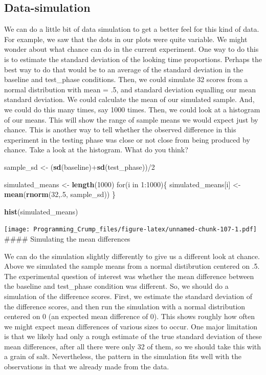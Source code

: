 \documentclass[]{book}
\newenvironment{Shaded}{\begin{snugshade}}{\end{snugshade}}
\newcommand{\KeywordTok}[1]{\textcolor[rgb]{0.13,0.29,0.53}{\textbf{{#1}}}}
\newcommand{\DecValTok}[1]{\textcolor[rgb]{0.00,0.00,0.81}{{#1}}}
\newcommand{\StringTok}[1]{\textcolor[rgb]{0.31,0.60,0.02}{{#1}}}
\newcommand{\NormalTok}[1]{{#1}}
\theoremstyle{definition}
\theoremstyle{definition}
\theoremstyle{definition}
\theoremstyle{remark}
\begin{document}
\subsection{Data-simulation}\label{data-simulation}

We can do a little bit of data simulation to get a better feel for this
kind of data. For example, we saw that the dots in our plots were quite
variable. We might wonder about what chance can do in the current
experiment. One way to do this is to estimate the standard deviation of
the looking time proportions. Perhaps the best way to do that would be
to an average of the standard deviation in the baseline and test\_phase
conditions. Then, we could simulate 32 scores from a normal distribution
with mean = .5, and standard deviation equalling our mean standard
deviation. We could calculate the mean of our simulated sample. And, we
could do this many times, say 1000 times. Then, we could look at a
histogram of our means. This will show the range of sample means we
would expect just by chance. This is another way to tell whether the
observed difference in this experiment in the testing phase was close or
not close from being produced by chance. Take a look at the histogram.
What do you think?

\begin{Shaded}
\begin{Highlighting}[]
\NormalTok{sample_sd   <-}\StringTok{ }\NormalTok{(}\KeywordTok{sd}\NormalTok{(baseline)+}\KeywordTok{sd}\NormalTok{(test_phase))/}\DecValTok{2}

\NormalTok{simulated_means <-}\StringTok{ }\KeywordTok{length}\NormalTok{(}\DecValTok{1000}\NormalTok{)}
\NormalTok{for(i in }\DecValTok{1}\NormalTok{:}\DecValTok{1000}\NormalTok{)\{}
 \NormalTok{simulated_means[i] <-}\StringTok{ }\KeywordTok{mean}\NormalTok{(}\KeywordTok{rnorm}\NormalTok{(}\DecValTok{32}\NormalTok{,.}\DecValTok{5}\NormalTok{, sample_sd))}
\NormalTok{\}}

\KeywordTok{hist}\NormalTok{(simulated_means)}
\end{Highlighting}
\end{Shaded}

\texttt{[image: Programming\_Crump\_files/figure-latex/unnamed-chunk-107-1.pdf]}
\#\#\#\# Simulating the mean differences

We can do the simulation slightly differently to give us a different
look at chance. Above we simulated the sample means from a normal
distibrution centered on .5. The experimental question of interest was
whether the mean difference between the baseline and test\_phase
condition was different. So, we should do a simulation of the difference
scores. First, we estimate the standard deviation of the difference
scores, and then run the simulation with a normal distribution centered
on 0 (an expected mean difference of 0). This shows roughly how often we
might expect mean differences of various sizes to occur. One major
limitation is that we likely had only a rough estimate of the true
standard deviation of these mean differences, after all there were only
32 of them, so we should take this with a grain of salt. Nevertheless,
the pattern in the simulation fits well with the observations in that we
already made from the data.
\end{document}
